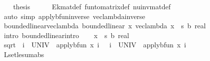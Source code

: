 \begin{isabellebody}
\ \ \isamarkupfalse%
\ {\isacharquery}{\kern0pt}thesis\isanewline
\ \ \ \ \isamarkupfalse%
\ Ek{\isacharunderscore}{\kern0pt}mat{\isacharunderscore}{\kern0pt}def\ fun{\isacharunderscore}{\kern0pt}to{\isacharunderscore}{\kern0pt}matrix{\isacharunderscore}{\kern0pt}def\ nu{\isacharunderscore}{\kern0pt}inv{\isacharunderscore}{\kern0pt}mat{\isacharunderscore}{\kern0pt}def\isanewline
\ \ \ \ \isamarkupfalse%
\ {\isacharparenleft}{\kern0pt}auto\ simp{\isacharcolon}{\kern0pt}\ apply{\isacharunderscore}{\kern0pt}bfun{\isacharunderscore}{\kern0pt}inverse\ vec{\isacharunderscore}{\kern0pt}lambda{\isacharunderscore}{\kern0pt}inverse{\isacharparenright}{\kern0pt}\isanewline
{}\isamarkupfalse%
%
\endisatagproof
{\isafoldproof}%
%
\isadelimproof
\isanewline
%
\endisadelimproof
\isanewline
{}\isamarkupfalse%
\ bounded{\isacharunderscore}{\kern0pt}linear{\isacharunderscore}{\kern0pt}vec{\isacharunderscore}{\kern0pt}lambda{\isacharcolon}{\kern0pt}\ {\isachardoublequoteopen}bounded{\isacharunderscore}{\kern0pt}linear\ {\isacharparenleft}{\kern0pt}{\isasymlambda}x{\isachardot}{\kern0pt}\ vec{\isacharunderscore}{\kern0pt}lambda\ {\isacharparenleft}{\kern0pt}x\ {\isacharcolon}{\kern0pt}{\isacharcolon}{\kern0pt}\ {\isacharprime}{\kern0pt}s\ {\isasymRightarrow}\isactrlsub b\ real{\isacharparenright}{\kern0pt}{\isacharparenright}{\kern0pt}{\isachardoublequoteclose}\isanewline
%
\isadelimproof
%
\endisadelimproof
%
\isatagproof
{}\isamarkupfalse%
\ {\isacharparenleft}{\kern0pt}intro\ bounded{\isacharunderscore}{\kern0pt}linear{\isacharunderscore}{\kern0pt}intro{\isacharparenright}{\kern0pt}\isanewline
\ \ \isamarkupfalse%
\ x\ {\isacharcolon}{\kern0pt}{\isacharcolon}{\kern0pt}\ {\isachardoublequoteopen}{\isacharprime}{\kern0pt}s\ {\isasymRightarrow}\isactrlsub b\ real{\isachardoublequoteclose}\isanewline
\ \ \isamarkupfalse%
\ {\isachardoublequoteopen}sqrt\ {\isacharparenleft}{\kern0pt}{\isasymSum}\ i\ {\isasymin}\ UNIV\ {\isachardot}{\kern0pt}\ {\isacharparenleft}{\kern0pt}apply{\isacharunderscore}{\kern0pt}bfun\ x\ i{\isacharparenright}{\kern0pt}\ {\isasymle}\ {\isacharparenleft}{\kern0pt}{\isasymSum}\ i\ {\isasymin}\ UNIV\ {\isachardot}{\kern0pt}\ {\isasymbar}{\isacharparenleft}{\kern0pt}apply{\isacharunderscore}{\kern0pt}bfun\ x\ i{\isacharparenright}{\kern0pt}{\isasymbar}{\isacharparenright}{\kern0pt}{\isachardoublequoteclose}\isanewline
\ \ \ \ \isamarkupfalse%
\ L{}{\isacharunderscore}{\kern0pt}set{\isacharunderscore}{\kern0pt}le{\isacharunderscore}{\kern0pt}sum{\isacharunderscore}{\kern0pt}abs\ \isanewline

\end{isabellebody}
